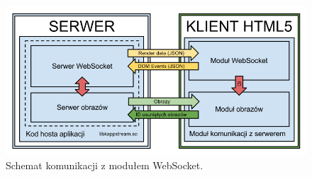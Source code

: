 \begin{figure}[H]
\centering
\includegraphics[width=1.0\linewidth]{img/arch-socket}
\caption{Schemat komunikacji z modułem WebSocket.}
\label{fig:arch-socket}
\end{figure}